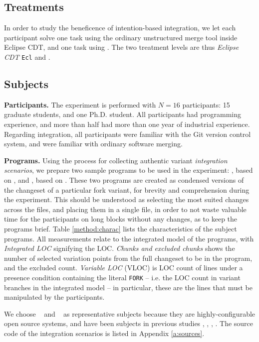\subsection{Treatments}
In order to study the beneficence of intention-based integration, we let each participant solve one task using the ordinary unstructured merge tool inside Eclipse CDT, and one task using \tooln. The two treatment levels are thus \textit{Eclipse CDT} \texttt{Ecl} and \textit{\tooln} \inc.

\subsection{Subjects}
\textbf{Participants.}
The experiment is performed with $N=16$ participants: 15 graduate students, and one Ph.D. student. All participants had programming experience, and more than half had more than one year of industrial experience. Regarding integration, all participants were familiar with the Git version control system, and were familiar with ordinary software merging.

\textbf{Programs.} Using the process for collecting authentic variant \textit{integration scenarios}, we prepare two sample programs to be used in the experiment: \po, based on \busybox, and \pt, based on \vim. These two programs are created as condensed versions of the changeset of a particular fork variant, for brevity and comprehension during the experiment. This should be understood as selecting the most suited changes across the files, and placing them in a single file, in order to not waste valuable time for the participants on long blocks without any changes, as to keep the programs brief. Table \ref{method:charac} lists the characteristics of the subject programs. All measurements relate to the integrated model of the programs, with \textit{Integrated LOC} signifying the LOC. \textit{Chunks and excluded chunks} shows the number of selected variation points from the full changeset to be in the program, and the excluded count. \textit{Variable LOC} (VLOC) is LOC count of lines under a presence condition containing the literal \texttt{FORK} -- i.e. the LOC count in variant branches in the integrated model -- in particular, these are the lines that must be manipulated by the participants.

We choose \busybox~ and \vim~ as representative subjects because they are highly-configurable open source systems, and have been subjects in previous studies \cite{berger2013study}, \cite{liebig2010preprocessor}, \cite{liebig2011discipline}, \cite{hunsen2016}. The source code of the integration scenarios is listed in Appendix \ref{a:sources}.

